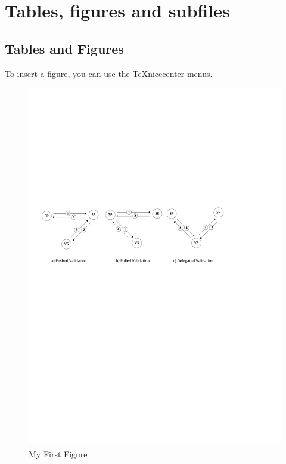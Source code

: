 \documentclass{beamer}
\begin{document}
\section{Tables, figures and subfiles}\label{sec:background}

\subsection{Tables and Figures}

\begin{frame}
To insert a figure, you can use the TeXnicecenter menus. 
\begin{figure}
	\centering
	\includegraphics[width=1.00\linewidth]{att-models-base.pdf}
	\caption{My First Figure}
	\label{fig:att-models-base}
\end{figure}

\end{frame}
\end{document}

